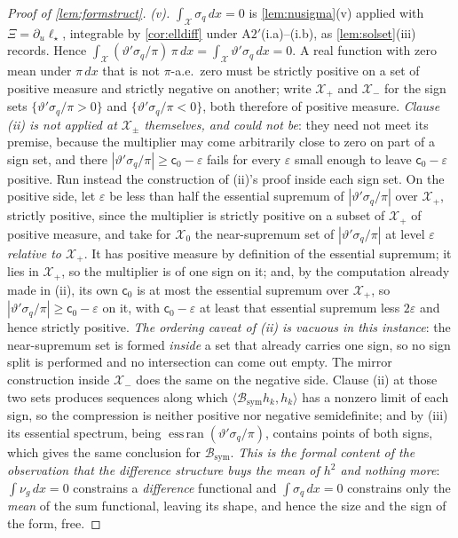 \begin{proof}[Proof of \cref{lem:formstruct}]
\emph{(v).} $\int_{\mathcal X}\sigma_q\,dx=0$ is \cref{lem:nusigma}(v) applied with
$\Xi=\partial_u\ell_\star$, integrable by \cref{cor:elldiff} under A$2'$(i.a)--(i.b), as
\cref{lem:solset}(iii) records. Hence
$\int_{\mathcal X}(\vartheta'\sigma_q/\pi)\,\pi\,dx=\int_{\mathcal X}\vartheta'\sigma_q\,dx=0$. A
real function with zero mean under $\pi\,dx$ that is not $\pi$-a.e.\ zero must be strictly positive on a
set of positive measure and strictly negative on another; write $\mathcal X_+$ and $\mathcal X_-$ for the
sign sets $\{\vartheta'\sigma_q/\pi>0\}$ and $\{\vartheta'\sigma_q/\pi<0\}$, both therefore of positive
measure. \emph{Clause \textup{(ii)} is not applied at $\mathcal X_\pm$ themselves, and could not be}:
they need not meet its premise, because the multiplier may come arbitrarily close to zero on part of a
sign set, and there $|\vartheta'\sigma_q/\pi|\ge\mathsf c_0-\varepsilon$ fails for every $\varepsilon$
small enough to leave $\mathsf c_0-\varepsilon$ positive. Run instead the construction of
\textup{(ii)}'s proof inside each sign set. On the positive side, let $\varepsilon$ be less than half
the essential supremum of $|\vartheta'\sigma_q/\pi|$ over $\mathcal X_+$, strictly positive, since the
multiplier is strictly positive on a subset of $\mathcal X_+$ of positive measure, and take for
$\mathcal X_0$ the near-supremum set of $|\vartheta'\sigma_q/\pi|$ at level $\varepsilon$ \emph{relative
to $\mathcal X_+$}. It has positive measure by definition of the essential supremum; it lies in
$\mathcal X_+$, so the multiplier is of one sign on it; and, by the computation already made in
\textup{(ii)}, its own $\mathsf c_0$ is at most the essential supremum over $\mathcal X_+$, so
$|\vartheta'\sigma_q/\pi|\ge\mathsf c_0-\varepsilon$ on it, with $\mathsf c_0-\varepsilon$ at least that
essential supremum less $2\varepsilon$ and hence strictly positive. \emph{The ordering caveat of
\textup{(ii)} is vacuous in this instance}: the near-supremum set is formed \emph{inside} a set that
already carries one sign, so no sign split is performed and no intersection can come out empty. The
mirror construction inside $\mathcal X_-$ does the same on the negative side. Clause \textup{(ii)} at
those two sets produces sequences along which
$\langle\mathcal B_{\mathrm{sym}}h_k,h_k\rangle$ has a nonzero limit of each sign, so the
compression is neither positive nor negative semidefinite; and by (iii) its essential spectrum, being
$\operatorname{ess\,ran}(\vartheta'\sigma_q/\pi)$, contains points of both signs, which gives the same
conclusion for $\mathcal B_{\mathrm{sym}}$. \emph{This is the formal content of the observation that the difference
structure buys the mean of $h^{2}$ and nothing more}: $\int\nu_g\,dx=0$ constrains a
\emph{difference} functional and $\int\sigma_q\,dx=0$ constrains only the \emph{mean} of the sum
functional, leaving its shape, and hence the size and the sign of the form, free.
\end{proof}

